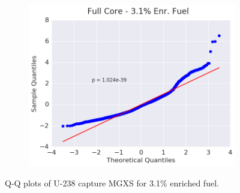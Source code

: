 \begin{figure}[h!]
\begin{subfigure}{0.5\textwidth}
  \includegraphics[width=\linewidth]{figures/patterns/full-core/quantile/31-enr-capt-1} \caption{}
  \label{fig:chap9-qq-full-core-3.1-capt}
\end{subfigure}
\caption[Q-Q plots of U-238 capture MGXS for 3.1\% enriched fuel]{Q-Q plots of U-238 capture \ac{MGXS} for 3.1\% enriched fuel.}
\label{fig:chap9-qq-3.1-capt}
\end{figure}


